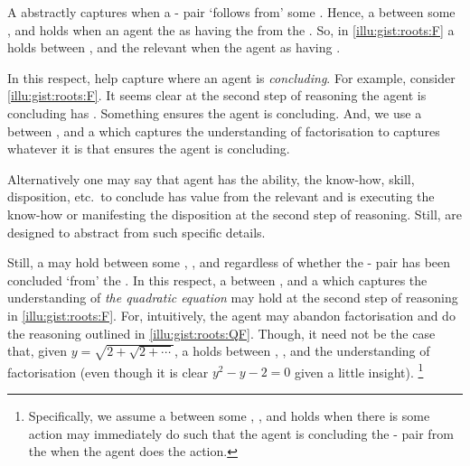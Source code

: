 \begin{note}
  A \emph{} abstractly captures when a - pair `follows from' some \pool{}.
  Hence, a \ros{} between some ,  and  holds when an agent \eval{} the \prop{} as having the  from the .
  So, in \autoref{illu:gist:roots:F} a \ros{} holds between \propM{\rootsCon{}},  and the relevant \pool{} when the agent \evals{} \propM{\rootsCon{}} as having  .

  In this respect,  help capture where an agent is \emph{concluding}.
  For example, consider \autoref{illu:gist:roots:F}.
  It seems clear at the second step of reasoning the agent is concluding \propM{\rootsCon{}} has \val{} .
  Something ensures the agent is concluding.
  And, we use a \ros{} between \propM{\rootsCon{}},  and a \pool{} which captures the \agents{} understanding of factorisation to captures whatever it is that ensures the agent is concluding.

  Alternatively one may say that agent has the ability, the know-how, skill, disposition, etc.\ to conclude \propM{\rootsCon{}} has value  from the relevant \pool{} and is executing the know-how or manifesting the disposition at the second step of reasoning.
  Still,  are designed to abstract from such specific details.

  Still, a  may hold between some , , and \pool{} regardless of whether the - pair has been concluded `from' the \pool{}.
  In this respect, a \ros{} between \propM{\rootsCon{}},  and a \pool{} which captures the \agents{} understanding of \emph{the quadratic equation} may hold at the second step of reasoning in \autoref{illu:gist:roots:F}.
  For, intuitively, the agent may abandon factorisation and do the reasoning outlined in \autoref{illu:gist:roots:QF}.
  Though, it need not be the case that, given \(y = \sqrt{ 2 + \sqrt{2 + \cdots}}\), a \ros{} holds between , , and the \agents{} understanding of factorisation (even though it is clear \(y^{2} - y - 2 = 0\) given a little insight).%
  \footnote{
    Specifically, we assume a \ros{} between some , , and  holds when there is some action may immediately do such that the agent is concluding the - pair from the \pool{} when the agent does the action.
  }
\end{note}


